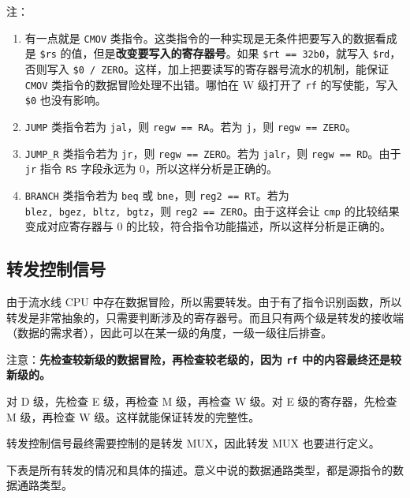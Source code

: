 \documentclass[12pt,AutoFakeBold,AutoFakeSlant]{article}
\providecommand{\tightlist}{%
  \setlength{\itemsep}{0pt}\setlength{\parskip}{0pt}}
\begin{document}
注：

\begin{enumerate}
\def\labelenumi{\arabic{enumi}.}
\tightlist
\item
  有一点就是 \texttt{CMOV}
  类指令。这类指令的一种实现是无条件把要写入的数据看成是 \texttt{\$rs}
  的值，但是\textbf{改变要写入的寄存器号}。如果
  \texttt{\$rt\ ==\ 32\textquotesingle{}b0}，就写入
  \texttt{\$rd}，否则写入
  \texttt{\$0\ /\ ZERO}。这样，加上把要读写的寄存器号流水的机制，能保证
  \texttt{CMOV} 类指令的数据冒险处理不出错。哪怕在 W 级打开了
  \texttt{rf} 的写使能，写入 \texttt{\$0} 也没有影响。
\item
  \texttt{JUMP} 类指令若为 \texttt{jal}，则 \texttt{regw\ ==\ RA}。若为
  \texttt{j}，则 \texttt{regw\ ==\ ZERO}。
\item
  \texttt{JUMP\_R} 类指令若为 \texttt{jr}，则
  \texttt{regw\ ==\ ZERO}。若为 \texttt{jalr}，则
  \texttt{regw\ ==\ RD}。由于 \texttt{jr} 指令 \texttt{RS} 字段永远为
  0，所以这样分析是正确的。
\item
  \texttt{BRANCH} 类指令若为 \texttt{beq} 或 \texttt{bne}，则
  \texttt{reg2\ ==\ RT}。若为 \texttt{blez,\ bgez,\ bltz,\ bgtz}，则
  \texttt{reg2\ ==\ ZERO}。由于这样会让 \texttt{cmp}
  的比较结果变成对应寄存器与 0
  的比较，符合指令功能描述，所以这样分析是正确的。
\end{enumerate}

\hypertarget{ux8f6cux53d1ux63a7ux5236ux4fe1ux53f7}{%
\subsection{转发控制信号}\label{ux8f6cux53d1ux63a7ux5236ux4fe1ux53f7}}

由于流水线 CPU
中存在数据冒险，所以需要转发。由于有了指令识别函数，所以转发是非常抽象的，只需要判断涉及的寄存器号。而且只有两个级是转发的接收端（数据的需求者），因此可以在某一级的角度，一级一级往后排查。

注意：\textbf{先检查较新级的数据冒险，再检查较老级的，因为 \texttt{rf}
中的内容最终还是较新级的。}

对 D 级，先检查 E 级，再检查 M 级，再检查 W 级。对 E 级的寄存器，先检查
M 级，再检查 W 级。这样就能保证转发的完整性。

转发控制信号最终需要控制的是转发 MUX，因此转发 MUX 也要进行定义。

下表是所有转发的情况和具体的描述。意义中说的数据通路类型，都是源指令的数据通路类型。
\end{document}
